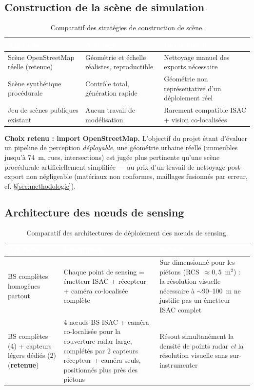 \documentclass[12pt,a4paper,titlepage]{article}
\newcommand{\hd}[1]{\textcolor{white}{\textbf{#1}}}
\newcommand{\choix}{\rowcolor{tabchoice}}
\begin{document}
\subsection{Construction de la scène de simulation}

\begin{table}[H]
    \centering
    \caption{Comparatif des stratégies de construction de scène.}
    \begin{tabularx}{\textwidth}{F{4cm}LL}
        \toprule
        \hd{Approche} & \hd{Avantage} & \hd{Inconvénient} \\
        \midrule
        \choix Scène OpenStreetMap réelle (retenue) & Géométrie et échelle réalistes, reproductible & Nettoyage manuel des exports nécessaire \\
        Scène synthétique procédurale & Contrôle total, génération rapide & Géométrie non représentative d'un déploiement réel \\
        Jeu de scènes publiques existant & Aucun travail de modélisation & Rarement compatible ISAC + vision co-localisées \\
        \bottomrule
    \end{tabularx}
\end{table}

\textbf{Choix retenu : import OpenStreetMap.} L'objectif du projet étant d'évaluer un pipeline de perception \textit{déployable}, une géométrie urbaine réelle (immeubles jusqu'à 74~m, rues, intersections) est jugée plus pertinente qu'une scène procédurale artificiellement simplifiée --- au prix d'un travail de nettoyage post-export non négligeable (matériaux non conformes, maillages fusionnés par erreur, cf. \S\ref{sec:methodologie}).

\subsection{Architecture des n\oe uds de sensing}
\label{subsec:choix_architecture_noeuds}

\begin{table}[H]
    \centering
    \caption{Comparatif des architectures de déploiement des n\oe uds de sensing.}
    \begin{tabularx}{\textwidth}{F{4cm}LL}
        \toprule
        \hd{Approche} & \hd{Description} & \hd{Verdict} \\
        \midrule
        BS complètes homogènes partout & Chaque point de sensing = émetteur ISAC + récepteur + caméra co-localisée complète & Sur-dimensionné pour les piétons (RCS~$\approx 0{,}5$~m$^2$) : la résolution visuelle nécessaire à $\sim$90--100~m ne justifie pas un émetteur ISAC complet \\
        \choix BS complètes (4) + capteurs légers dédiés (2) (\textbf{retenue}) & 4 n\oe uds BS ISAC + caméra co-localisée pour la couverture radar large, complétés par 2 capteurs récepteur + caméra seuls, positionnés plus près des piétons & Résout simultanément la densité de points radar \textit{et} la résolution visuelle sans sur-instrumenter \\
        \bottomrule
    \end{tabularx}
\end{table}
\end{document}
